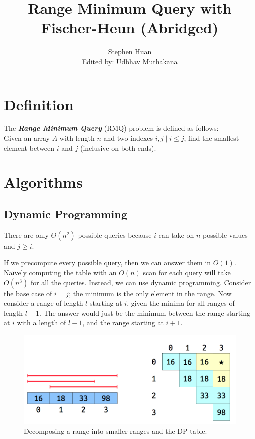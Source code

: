 \documentclass[11pt, oneside]{article}
\title{Range Minimum Query with Fischer-Heun (Abridged)}
\author{Stephen Huan\\ Edited by: Udbhav Muthakana}
\newcommand{\emphasis}[1]{\textbf{\textit{#1}}}
\begin{document}
\maketitle

\section{Definition}

The \emphasis{Range Minimum Query} (RMQ) problem is defined as follows: \\
Given an array \( A \) with length \( n \) and two indexes \( i, j \mid i \leq j \),
find the smallest element between \( i \) and \( j \) (inclusive on both ends).

\section{Algorithms}
\subsection{Dynamic Programming}

There are only \( \Theta(n^2) \) possible queries because \( i \) can take on \( n \) possible values
and \( j \geq i \).

If we precompute every possible query, then we can answer them in \( O(1) \). Naïvely computing the table
with an \( O(n) \) scan for each query will take \( O(n^3) \) for all the queries.
Instead, we can use dynamic programming. Consider the base case of \( i = j \);
the minimum is the only element in the range. Now consider a range of length \( l \) starting
at \( i \), given the minima for all ranges of length \( l - 1 \).
The answer would just be the minimum between the range starting at \( i \) with a length of \( l - 1 \),
and the range starting at \( i + 1 \).

\begin{figure}[h!]
\centering
\includegraphics[scale=0.25]{dp}
\caption{Decomposing a range into smaller ranges and the DP table.}
\end{figure}
\end{document}
